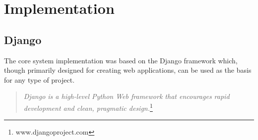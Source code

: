\chapter{Implementation}

\section{Django}

The core system implementation was based on the Django framework which, though
primarily designed for creating web applications, can be used as the basis for
any type of project.

\begin{quote}
    \emph{Django is a high-level Python Web framework that encourages rapid
    development and clean, pragmatic design.}\footnote{www.djangoproject.com}
\end{quote}

